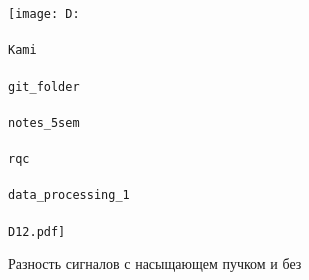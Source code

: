 \begin{figure}[h]
    \centering
    \texttt{[image: D:\\\\Kami\\\\git\_folder\\\\notes\_5sem\\\\rqc\\\\data\_processing\_1\\\\D12.pdf]}
    \caption{Разность сигналов с насыщающем пучком и без}
    \label{fig:exp1}
\end{figure}
